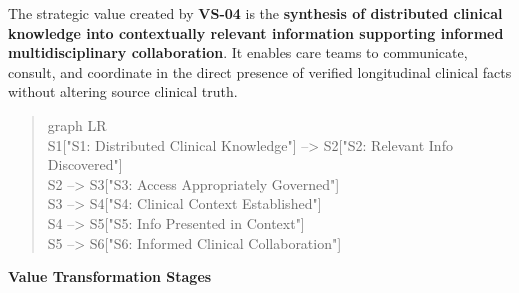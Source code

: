 The strategic value created by \textbf{VS-04} is the \textbf{synthesis of distributed clinical knowledge into contextually relevant information supporting informed multidisciplinary collaboration}. It enables care teams to communicate, consult, and coordinate in the direct presence of verified longitudinal clinical facts without altering source clinical truth.



\begin{quote}\small\ttfamily
graph LR\\
    S1["S1: Distributed Clinical Knowledge"] --> S2["S2: Relevant Info Discovered"]\\
    S2 --> S3["S3: Access Appropriately Governed"]\\
    S3 --> S4["S4: Clinical Context Established"]\\
    S4 --> S5["S5: Info Presented in Context"]\\
    S5 --> S6["S6: Informed Clinical Collaboration"]\\

\end{quote}


\par\medskip\textbf{Value Transformation Stages}\par


